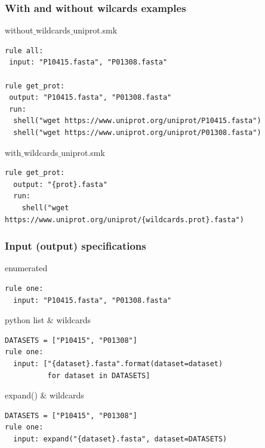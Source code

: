 \begin{frame}[containsverbatim]
\frametitle{With and without wilcards examples}
\begin{block}{without$\_$wildcards$\_$uniprot.smk}
\begin{lstlisting}
rule all:
 input: "P10415.fasta", "P01308.fasta"

rule get_prot:
 output: "P10415.fasta", "P01308.fasta"
 run:
  shell("wget https://www.uniprot.org/uniprot/P10415.fasta")
  shell("wget https://www.uniprot.org/uniprot/P01308.fasta")
\end{lstlisting}
\end{block}
%
\begin{block}{with$\_$wildcards$\_$uniprot.smk}
\begin{lstlisting}
rule get_prot:
  output: "{prot}.fasta"
  run:
    shell("wget https://www.uniprot.org/uniprot/{wildcards.prot}.fasta")
\end{lstlisting}
\end{block}
\end{frame}
\begin{frame}[containsverbatim]
\frametitle{Input (output) specifications}
\begin{block}{enumerated}
\begin{lstlisting}
rule one:
  input: "P10415.fasta", "P01308.fasta"
\end{lstlisting}
\end{block}
\begin{block}{python list $\&$ wildcards}
\begin{lstlisting}
DATASETS = ["P10415", "P01308"]
rule one: 
  input: ["{dataset}.fasta".format(dataset=dataset) 
          for dataset in DATASETS] 
\end{lstlisting}
\end{block}
\begin{block}{expand() $\&$ wildcards}
\begin{lstlisting}
DATASETS = ["P10415", "P01308"]
rule one: 
  input: expand("{dataset}.fasta", dataset=DATASETS) 
\end{lstlisting}
\end{block}
\end{frame}
